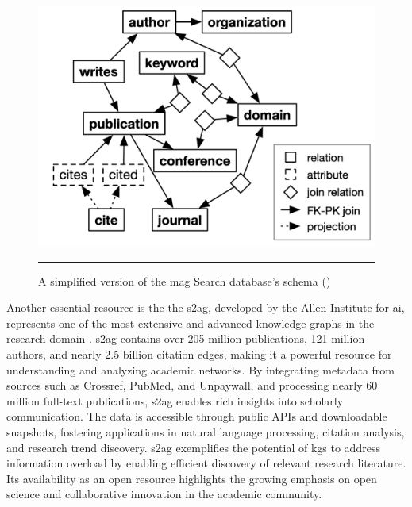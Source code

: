 \begin{figure}[htbp]
    \centering
 \includegraphics[width=.6\textwidth]{figures/literature-review/mag-schema.png}
     \rule{35em}{0.5pt}
    \caption{A simplified version of the \gls{mag} Search database's schema (\textcite{Baik2019})} 
 \label{fig:mag-schema}
\end{figure}

Another essential resource is the the \gls{s2ag}, developed by the Allen Institute for \acrlong{ai}, represents one of the most extensive and advanced knowledge graphs in the research domain \cite{S2AG}.
\gls{s2ag} contains over 205 million publications, 121 million authors, and nearly 2.5 billion citation edges, making it a powerful resource for understanding and analyzing academic networks.
By integrating metadata from sources such as Crossref, PubMed, and Unpaywall, and processing nearly 60 million full-text publications, \gls{s2ag} enables rich insights into scholarly communication.
The data is accessible through public APIs and downloadable snapshots, fostering applications in natural language processing, citation analysis, and research trend discovery.
\gls{s2ag} exemplifies the potential of \glspl{kg} to address information overload by enabling efficient discovery of relevant research literature.
Its availability as an open resource highlights the growing emphasis on open science and collaborative innovation in the academic community.


